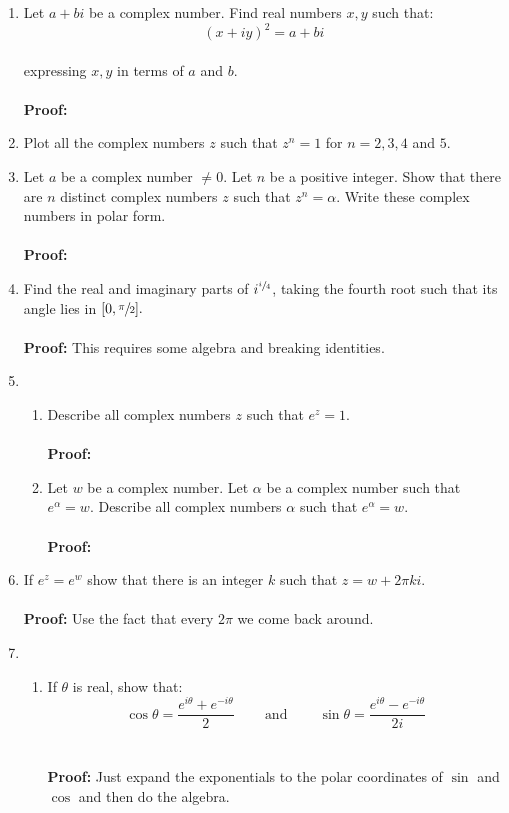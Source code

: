 \begin{enumerate}
	
	\item Let $a + bi$ be a complex number. Find real numbers $x, y$ such that:
	\[(x + iy)^2 = a + bi\] \\
	expressing $x, y$ in terms of $a$ and $b.$ \\
	\\
	\textbf{Proof:}
	
	\item Plot all the complex numbers $z$ such that $z^n = 1$ for $ n = 2, 3, 4$ and $5.$
	
	\item Let $a$ be a complex number $\neq 0.$ Let $n$ be a positive integer. Show that there are $n$ distinct complex numbers $z$ such that $z^n = \alpha.$ Write these complex numbers in polar form. \\
	\\
	\textbf{Proof:}
	
	\item Find the real and imaginary parts of $i^{\sfrac{i}{4}}$, taking the fourth root such that its angle lies in $[0, \sfrac{\pi}{2}].$ \\
	\\
	\textbf{Proof:} This requires some algebra and breaking identities.
	
	\item
	\begin{enumerate}
		\item Describe all complex numbers $z$ such that $e^z = 1.$ \\
		\\
		\textbf{Proof:}
		\item Let $w$ be a complex number. Let $\alpha$ be a complex number such that $e^{\alpha} = w.$ Describe all complex numbers $\alpha$ such that $e^\alpha = w.$ \\
		\\
		\textbf{Proof:}
	\end{enumerate} 

	\item If $e^z = e^w$ show that there is an integer $k$ such that $z = w + 2\pi k i.$ \\
	\\
	\textbf{Proof:} Use the fact that every $2\pi$ we come back around.
	
	\item 
	\begin{enumerate}
		\item If $\theta$ is real, show that:
		\[\cos{\theta} = \frac{e^{i\theta} + e^{-i\theta}}{2} \;\;\;\;\;\;\;\: \text{and} \;\;\;\;\;\;\;\; \sin{\theta} = {\frac{e^{i\theta} - e^{-i\theta}}{2i}}\] \\
		\\
		\textbf{Proof:} Just expand the exponentials to the polar coordinates of $\sin$ and $\cos$ and then do the algebra. \\
	

\end{enumerate}
\end{enumerate}
